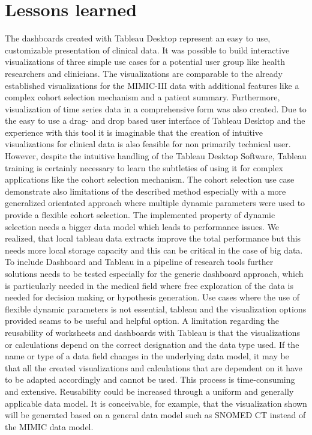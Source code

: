 \documentclass[aac,crcready]{iosart2x}
\begin{document}
\section{Lessons learned}\label{s5}
\noindent The dashboards created with Tableau Desktop represent an easy to use, customizable presentation of clinical data. It was possible to build interactive visualizations of three simple use cases for a potential user group like health researchers and clinicians. The visualizations are comparable to the already established visualizations for the MIMIC-III data with additional features like a complex cohort selection mechanism and a patient summary. Furthermore, visualization of time series data in a comprehensive form was also created. 
Due to the easy to use a drag- and drop based user interface of Tableau Desktop and the experience with this tool it is imaginable that the creation of intuitive visualizations for clinical data is also feasible for non primarily technical user. However, despite the intuitive handling of the Tableau Desktop Software, Tableau training is certainly necessary to learn the subtleties of using it for complex applications like the cohort selection mechanism. The cohort selection use case demonstrate also limitations of the described method especially with a more generalized orientated approach where multiple dynamic parameters were used to provide a flexible cohort selection. The implemented property of dynamic selection needs a bigger data model which leads to performance issues. We realized, that local tableau data extracts improve the total performance but this needs more local storage capacity and this can be critical in the case of big data. To include Dashboard and Tableau in a pipeline of research tools further solutions needs to be tested especially for the generic dashboard approach, which is particularly needed in the medical field where free exploration of the data is needed for decision making or hypothesis generation. Use cases where the use of flexible dynamic parameters is not essential, tableau and the visualization options provided seams to be useful and helpful option.
A limitation regarding the reusability of worksheets and dashboards with Tableau is that the visualizations or calculations depend on the correct designation and the data type used. If the name or type of a data field changes in the underlying data model, it may be that all the created visualizations and calculations that are dependent on it have to be adapted accordingly and cannot be used. This process is time-consuming and extensive. Reusability could be increased through a uniform and generally applicable data model. It is conceivable, for example, that the visualization shown will be generated based on a general data model such as SNOMED CT instead of the MIMIC data model.
\end{document}

